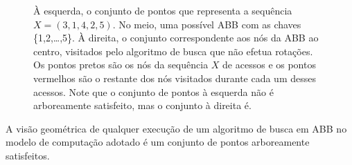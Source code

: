 \begin{figure}[h!]
\begin{minipage}[b]{0.33\textwidth}
    \end{minipage}\hfill
    \begin{minipage}[b]{0.33\textwidth}
        \centering
    \end{minipage}
    \caption{À esquerda, o conjunto de pontos que representa a sequência $X = (3,1,4,2,5)$. No meio, uma possível ABB com as chaves \{1,2,\ldots,5\}. À direita, o conjunto correspondente aos nós da ABB ao centro, visitados pelo algoritmo de busca que não efetua rotações. Os pontos pretos são os nós da sequência $X$ de acessos e os pontos vermelhos são o restante dos nós visitados durante cada um desses acessos. Note que o conjunto de pontos à esquerda não é arboreamente satisfeito, mas o conjunto à direita é.}
\label{fig:traducao-busca-em-ASS}
\end{figure}

\begin{lemma} A visão geométrica de qualquer execução de um algoritmo de busca em ABB no modelo de computação adotado é um conjunto de pontos arboreamente satisfeitos.
\label{lema:visao_geometrica_vira_ASS}
\end{lemma}

